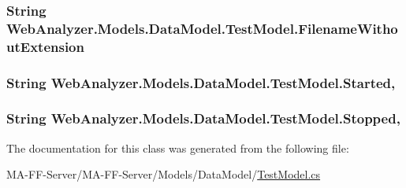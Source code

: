\subsubsection[{Filename\+Without\+Extension}]{\setlength{\rightskip}{0pt plus 5cm}String Web\+Analyzer.\+Models.\+Data\+Model.\+Test\+Model.\+Filename\+Without\+Extension\hspace{0.3cm}{\ttfamily [get]}}\label{class_web_analyzer_1_1_models_1_1_data_model_1_1_test_model_a91b896389e06b664e992c719f4d73e9b}
\hypertarget{class_web_analyzer_1_1_models_1_1_data_model_1_1_test_model_acdb09845b9c3bc8582f78d2729524216}{}
\subsubsection[{Started}]{\setlength{\rightskip}{0pt plus 5cm}String Web\+Analyzer.\+Models.\+Data\+Model.\+Test\+Model.\+Started\hspace{0.3cm}{\ttfamily [get]}, {\ttfamily [set]}}\label{class_web_analyzer_1_1_models_1_1_data_model_1_1_test_model_acdb09845b9c3bc8582f78d2729524216}
\hypertarget{class_web_analyzer_1_1_models_1_1_data_model_1_1_test_model_a636a8cedde376c835de9d909e8ec2c2d}{}
\subsubsection[{Stopped}]{\setlength{\rightskip}{0pt plus 5cm}String Web\+Analyzer.\+Models.\+Data\+Model.\+Test\+Model.\+Stopped\hspace{0.3cm}{\ttfamily [get]}, {\ttfamily [set]}}\label{class_web_analyzer_1_1_models_1_1_data_model_1_1_test_model_a636a8cedde376c835de9d909e8ec2c2d}


The documentation for this class was generated from the following file\+:\begin{DoxyCompactItemize}
\item 
M\+A-\/\+F\+F-\/\+Server/\+M\+A-\/\+F\+F-\/\+Server/\+Models/\+Data\+Model/\hyperlink{_test_model_8cs}{Test\+Model.\+cs}\end{DoxyCompactItemize}
